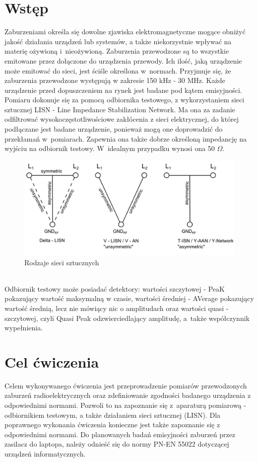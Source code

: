 \documentclass[12pt, a4paper, oneside]{article}
\begin{document}
\section{Wstęp}
\indent\indent Zaburzeniami określa się dowolne zjawiska elektromagnetyczne mogące obniżyć jakość działania urządzeń lub systemów, a także niekorzystnie wpływać na materię ożywioną i~nieożywioną. Zaburzenia przewodzone są to wszystkie emitowane przez dołączone do urządzenia przewody. Ich ilość, jaką urządzenie może emitować do sieci, jest ściśle określona w~normach. Przyjmuje się, że zaburzenia przewodzone występują w zakresie 150 kHz - 30 MHz. Każde urządzenie przed dopuszczeniem na rynek jest badane pod kątem emisyjności. Pomiaru dokonuje się za pomocą odbiornika testowego, z wykorzystaniem sieci sztucznej LISN - Line Impedance Stabilization Network. Ma ona za zadanie odfiltrować wysokoczęstotliwościowe zakłócenia z sieci elektrycznej, do której podłączane jest badane urządzenie, ponieważ mogą one doprowadzić do przekłamań w~pomiarach. Zapewnia ona także dobrze określoną impedancję na wyjściu na odbiornik testowy. W~idealnym przypadku wynosi ona 50 $\Omega$.
\begin{figure}[h!]
\centering
\caption{Rodzaje sieci sztucznych}
\includegraphics[scale=0.65]{f1.png}
\end{figure}\\
\indent Odbiornik testowy może posiadać detektory: wartości szczytowej - PeaK pokazujący wartość maksymalną w czasie, wartości średniej - AVerage pokazujący wartość średnią, lecz nie mówiący nic o amplitudach oraz wartości quasi - szczytowej, czyli Quasi Peak odzwierciedlający amplitudę, a~także współczynnik wypełnienia.
\section{Cel ćwiczenia}
\indent\indent Celem wykonywanego ćwiczenia jest przeprowadzenie pomiarów przewodzonych zaburzeń radioelektrycznych oraz zdefiniowanie zgodności badanego urządzenia z odpowiednimi normami. Pozwoli to na zapoznanie się z~aparaturą pomiarową - odbiornikiem testowym, a także działaniem sieci sztucznej (LISN). Dla poprawnego wykonania ćwiczenia konieczne jest także zapoznanie się z odpowiednimi normami. Do planowanych badań emisyjności zaburzeń przez zasilacz do laptopa, należy odnieść się do normy PN-EN 55022 dotyczącej urządzeń informatycznych.
\end{document}
